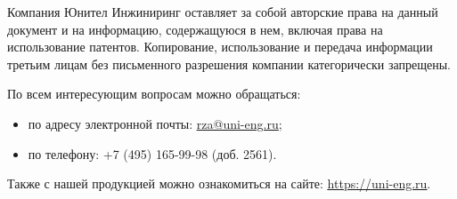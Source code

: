 \vskip 35mm
\par
Компания Юнител Инжиниринг оставляет за собой авторские права на данный документ и на информацию, содержащуюся в нем, включая права на использование патентов. Копирование, использование и передача информации третьим лицам без письменного разрешения компании категорически запрещены.

\vskip 10mm
\par
По всем интересующим вопросам можно обращаться:
\begin{itemize}
\item по адресу электронной почты: \href{mailto:rza@uni-eng.ru}{\color{unigreen}\uline{rza@uni-eng.ru}};
\item по телефону: +7 (495) 165-99-98 (доб. 2561).
\end{itemize}
Также с нашей продукцией можно ознакомиться на сайте: \href{https://uni-eng.ru}{\color{unigreen}\uline{https://uni-eng.ru}}.
